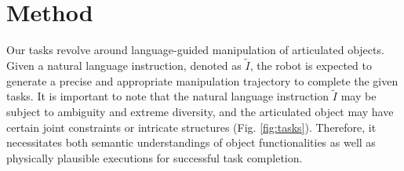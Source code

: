 \section{Method}



    


Our tasks revolve around language-guided manipulation of articulated objects. Given a natural language instruction, denoted as $\tilde{I}$, the robot is expected to generate a precise and appropriate manipulation trajectory to complete the given tasks. It is important to note that the natural language instruction $\tilde{I}$ may be subject to ambiguity and extreme diversity, and the articulated object may have certain joint constraints or intricate structures (Fig. \ref{fig:tasks}). Therefore, it necessitates both semantic understandings of object functionalities as well as physically plausible executions for successful task completion.

